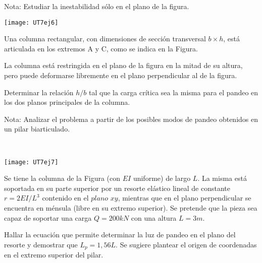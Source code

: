 Nota: Estudiar la inestabilidad sólo en el plano de la figura.

\begin{center}
	\texttt{[image: UT7ej6]}
\end{center}





\ejercicio

\begin{minipage}[b]{0.6\textwidth}
	
	Una columna rectangular, con dimensiones de sección transversal $b \times h$, está articulada en los extremos A y C, como se indica en la Figura.
	
	La columna está restringida en el plano de la figura en la mitad de su altura, pero puede deformarse libremente en el plano perpendicular al de la figura.
	
	Determinar la relación $h/b$ tal que la carga crítica sea la misma para el pandeo en los dos planos principales de la columna.
	
	Nota: Analizar el problema a partir de los posibles modos de pandeo obtenidos en un pilar biarticulado.
	
\end{minipage}
~
\begin{minipage}[b]{0.4\textwidth}
	\begin{center}
		\texttt{[image: UT7ej7]}
	\end{center}
\end{minipage}





\ejercicio

Se tiene la columna de la Figura (con $EI$ uniforme) de largo $L$. La misma está soportada en su parte superior por un resorte elástico lineal de constante $r=2EI/L^3$ contenido en el $plano$ $xy$, mientras que en el plano perpendicular se encuentra en ménsula (libre en su extremo superior). Se pretende que la pieza sea capaz de soportar una carga $Q=200 kN$ con una altura $L=3m$.

Hallar la ecuación que permite determinar la luz de pandeo en el plano del resorte y demostrar que $L_p=1,56L$. Se sugiere plantear el origen de coordenadas en el extremo superior del pilar.

%

